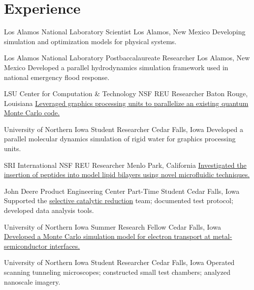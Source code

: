 \section{Experience}
		{Los Alamos National Laboratory}
		{Scientist}
		{Los Alamos, New Mexico}{}
		{Developing simulation and optimization models for physical systems.}

		{Los Alamos National Laboratory}
		{Postbaccalaureate Researcher}
		{Los Alamos, New Mexico}{}
		{Developed a parallel hydrodynamics simulation framework used in national emergency flood response.}

		{LSU Center for Computation \& Technology}
		{NSF REU Researcher}
		{Baton Rouge, Louisiana}{}
		{\href{http://www.institute.loni.org/lasigma/package/vmc/}{Leveraged graphics processing units to parallelize an existing quantum Monte Carlo code.}}

		{University of Northern Iowa}
		{Student Researcher}
		{Cedar Falls, Iowa}{}
		{Developed a parallel molecular dynamics simulation of rigid water for graphics processing units.}

		{SRI International}
		{NSF REU Researcher}
		{Menlo Park, California}{}
		{\href{http://www.sri.com/sites/default/files/brochures/sri-reu-2011.pdf}{Investigated the insertion of peptides into model lipid bilayers using novel microfluidic techniques.}}

		{John Deere Product Engineering Center}
		{Part-Time Student}
		{Cedar Falls, Iowa}{}
		{Supported the \href{https://www.deere.com/en_US/docs/pdfs/emissions/large_engine_technology_final.pdf}{selective catalytic reduction} team; documented test protocol; developed data analysis tools.}

		{University of Northern Iowa}
		{Summer Research Fellow}
		{Cedar Falls, Iowa}{}
		{\href{http://www.tasseff.com/documents/reports/2010-ballistic_transport_at_metal_semiconductor_interfaces.pdf}{Developed a Monte Carlo simulation model for electron transport at metal-semiconductor interfaces.}}

		{University of Northern Iowa}
		{Student Researcher}
		{Cedar Falls, Iowa}{}
		{Operated scanning tunneling microscopes; constructed small test chambers; analyzed nanoscale imagery.}
